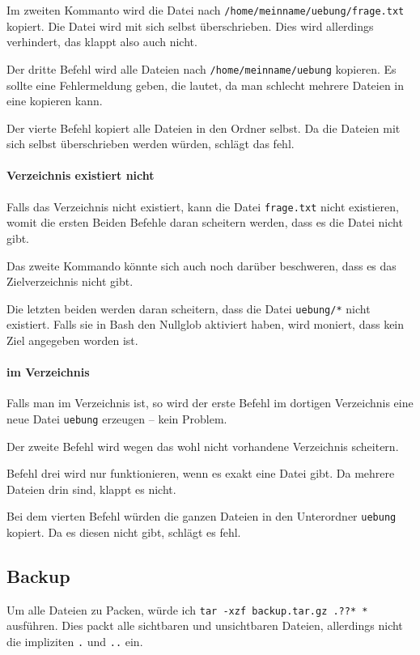 Im zweiten Kommanto wird die Datei nach \texttt{/home/meinname/uebung/frage.txt} kopiert. Die Datei wird mit sich selbst überschrieben. Dies wird allerdings verhindert, das klappt also auch nicht.

Der dritte Befehl wird alle Dateien nach \texttt{/home/meinname/uebung} kopieren. Es sollte eine Fehlermeldung geben, die  lautet, da man schlecht mehrere Dateien in eine kopieren kann.

Der vierte Befehl kopiert alle Dateien in den Ordner selbst. Da die Dateien mit sich selbst überschrieben werden würden, schlägt das fehl.

\paragraph*{Verzeichnis existiert nicht} Falls das Verzeichnis nicht existiert, kann die Datei \texttt{frage.txt} nicht existieren, womit die ersten Beiden Befehle daran scheitern werden, dass es die Datei nicht gibt.

Das zweite Kommando könnte sich auch noch darüber beschweren, dass es das Zielverzeichnis nicht gibt.

Die letzten beiden werden daran scheitern, dass die Datei \texttt{uebung/*} nicht existiert. Falls sie in Bash den Nullglob aktiviert haben, wird moniert, dass kein Ziel angegeben worden ist.

\paragraph*{im Verzeichnis}

Falls man im Verzeichnis ist, so wird der erste Befehl im dortigen Verzeichnis eine neue Datei \texttt{uebung} erzeugen -- kein Problem.

Der zweite Befehl wird wegen das wohl nicht vorhandene Verzeichnis scheitern.

Befehl drei wird nur funktionieren, wenn es exakt eine Datei gibt. Da mehrere Dateien drin sind, klappt es nicht.

Bei dem vierten Befehl würden die ganzen Dateien in den Unterordner \texttt{uebung} kopiert. Da es diesen nicht gibt, schlägt es fehl.

\subsection{Backup}

Um alle Dateien zu Packen, würde ich \verb#tar -xzf backup.tar.gz .??* *# ausführen. Dies packt alle sichtbaren und unsichtbaren Dateien, allerdings nicht die impliziten \texttt{.} und \texttt{..} ein.

